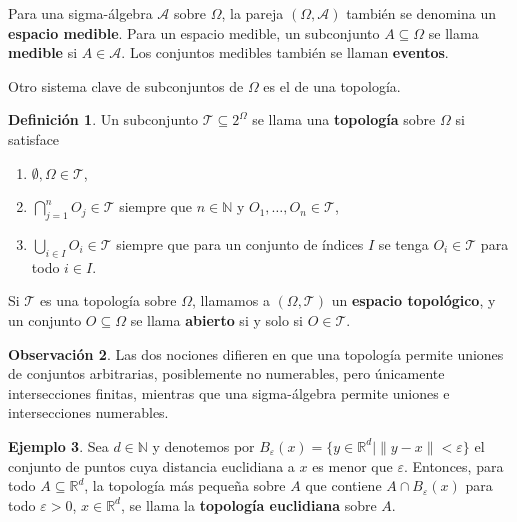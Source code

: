 \documentclass[11pt]{report}
\newenvironment{tcolorbox}[1][]{\par\medskip\noindent\ignorespaces}{\par\medskip}
\theoremstyle{definition}
\newtheorem{definicion}{Definición}[section]
\newtheorem{ejemplo}[definicion]{Ejemplo}
\newtheorem{observacion}[definicion]{Observación}
\theoremstyle{plain}
\numberwithin{equation}{section}
\begin{document}
Para una sigma-álgebra \(\mathcal{A}\) sobre \(\Omega\), la pareja \((\Omega,\mathcal{A})\) también se denomina un \textbf{espacio medible}. Para un espacio medible, un subconjunto \(A\subseteq \Omega\) se llama \textbf{medible} si \(A\in\mathcal{A}\). Los conjuntos medibles también se llaman \textbf{eventos}.

Otro sistema clave de subconjuntos de \(\Omega\) es el de una topología.

\begin{tcolorbox}[colback=blue!8, colframe=blue!8, boxrule=0pt]
\begin{definicion}
Un subconjunto \(\mathcal{T}\subseteq 2^\Omega\) se llama una \textbf{topología} sobre \(\Omega\) si satisface

\begin{enumerate}
    \item[(i)] \(\emptyset,\Omega\in\mathcal{T}\),
    \item[(ii)] \(\bigcap_{j=1}^{n} O_j\in\mathcal{T}\) siempre que \(n\in\mathbb{N}\) y \(O_1,\ldots,O_n\in\mathcal{T}\),
    \item[(iii)] \(\bigcup_{i\in I}O_i\in\mathcal{T}\) siempre que para un conjunto de índices \(I\) se tenga \(O_i\in\mathcal{T}\) para todo \(i\in I\).
\end{enumerate}
\end{definicion}
\end{tcolorbox}

\begin{tcolorbox}[colback=blue!8, colframe=blue!8, boxrule=0pt]
Si \(\mathcal{T}\) es una topología sobre \(\Omega\), llamamos a \((\Omega,\mathcal{T})\) un \textbf{espacio topológico}, y un conjunto \(O\subseteq\Omega\) se llama \textbf{abierto} si y solo si \(O\in\mathcal{T}\).
\end{tcolorbox}

\begin{observacion}
Las dos nociones difieren en que una topología permite uniones de conjuntos arbitrarias, posiblemente no numerables, pero únicamente intersecciones finitas, mientras que una sigma-álgebra permite uniones e intersecciones numerables.
\end{observacion}

\begin{ejemplo}
Sea \(d\in\mathbb{N}\) y denotemos por \(B_\varepsilon(x)=\{y\in\mathbb{R}^d\mid \|y-x\|<\varepsilon\}\) el conjunto de puntos cuya distancia euclidiana a \(x\) es menor que \(\varepsilon\). Entonces, para todo \(A\subseteq\mathbb{R}^d\), la topología más pequeña sobre \(A\) que contiene \(A\cap B_\varepsilon(x)\) para todo \(\varepsilon>0\), \(x\in\mathbb{R}^d\), se llama la \textbf{topología euclidiana} sobre \(A\).
\end{ejemplo}
\end{document}
